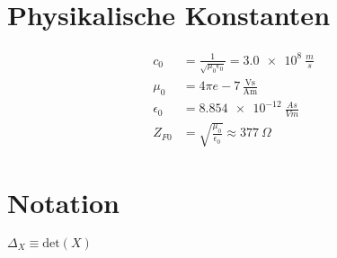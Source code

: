 \section{Physikalische Konstanten}
\begin{align*}
    c_0 &= \frac{1}{\sqrt{\mu_0\epsilon_0}} = \SI{3.0e8}{\frac{m}{s}}\\
    \mu_0 &= 4\pi e-7\,\frac{\mathrm{Vs}}{\mathrm{Am}}\\
    \epsilon_0 &= \SI{8.854e-12}{\frac{As}{Vm}}\\
    Z_{F0} &= \sqrt{\frac{\mu_0}{\epsilon_0}} \approx \SI{377}{\Omega}
\end{align*}
\section{Notation}
\centering
\(\Delta_X \equiv \mathrm{det}(X)\)

